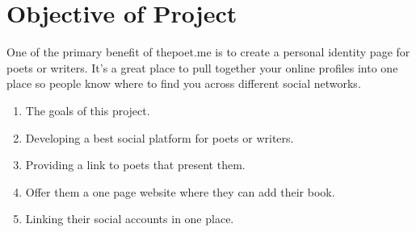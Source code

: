 \section{Objective of Project}
One of the primary benefit of thepoet.me is to create a personal identity page for poets or writers. It's a great place to pull together your online profiles into one place so people know where to find you across different social networks.

\begin{enumerate}
   \item The goals of this project.
   \item Developing a best social platform for poets or writers.
   \item Providing a link to poets that present them.
   \item Offer them a one page website where they can add their book.
   \item Linking their social accounts in one place.
\end{enumerate}


%  
%  


